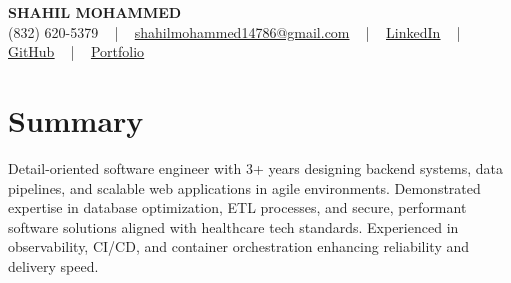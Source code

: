 \documentclass[letterpaper,10pt]{article}
\begin{document}
\begin{center}
    {\fontsize{14pt}{12pt}\selectfont \textbf{\MakeUppercase{Shahil Mohammed}}}\\ \vspace{2pt}
    \fontsize{10pt}{12pt}\selectfont (832) 620-5379 ~ | ~ \href{mailto:shahilmohammed14786@gmail.com}{shahilmohammed14786@gmail.com} ~ | ~  
    \href{https://www.linkedin.com/in/shahil-mohammed-9652931a1/}{\color{blue}\underline{LinkedIn}}  ~ | ~ 
    \href{https://github.com/freakbeast14}{\color{blue}\underline{GitHub}} ~ | ~ 
    \href{https://shahil-mohammed.netlify.app/}{\color{blue}\underline{Portfolio}}
    \vspace{-8pt}
\end{center}

\section{Summary}
\vspace{-2pt}\fontsize{8pt}{9pt}\selectfont
Detail-oriented software engineer with 3+ years designing backend systems, data pipelines, and scalable web applications in agile environments. Demonstrated expertise in database optimization, ETL processes, and secure, performant software solutions aligned with healthcare tech standards. Experienced in observability, CI/CD, and container orchestration enhancing reliability and delivery speed.
 \vspace{-5pt}
 
\vspace{-2pt}
\end{document}

